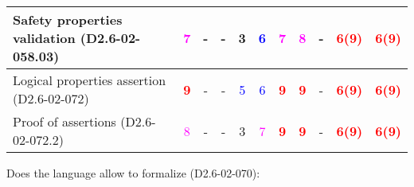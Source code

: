 \begin{tabular}{|l | c | c | c | c | c | c | c | c | c | c |}
\hline
Safety properties validation (D2.6-02-058.03) & \textcolor{magenta}{7} & - & - & 3     & \textcolor{blue}{6} & \textcolor{magenta}{7} & \textcolor{magenta}{8} & - & \textcolor{red}{\textbf{6(9)}}   & \textcolor{red}{\textbf{6(9)}}   \\
\hline
Logical properties assertion (D2.6-02-072) & \textcolor{red}{\textbf{9}} & - & - & \textcolor{blue}{5} & \textcolor{blue}{6} & \textcolor{red}{\textbf{9}} & \textcolor{red}{\textbf{9}} & - & \textcolor{red}{\textbf{6(9)}}   & \textcolor{red}{\textbf{6(9)}}   \\
\hline
Proof of assertions (D2.6-02-072.2) & \textcolor{magenta}{8} & - & - & 3     & \textcolor{magenta}{7} & \textcolor{red}{\textbf{9}} & \textcolor{red}{\textbf{9}} & - & \textcolor{red}{\textbf{6(9)}}   & \textcolor{red}{\textbf{6(9)}}   \\
\hline
\end{tabular}

Does the language allow to  formalize (D2.6-02-070):

